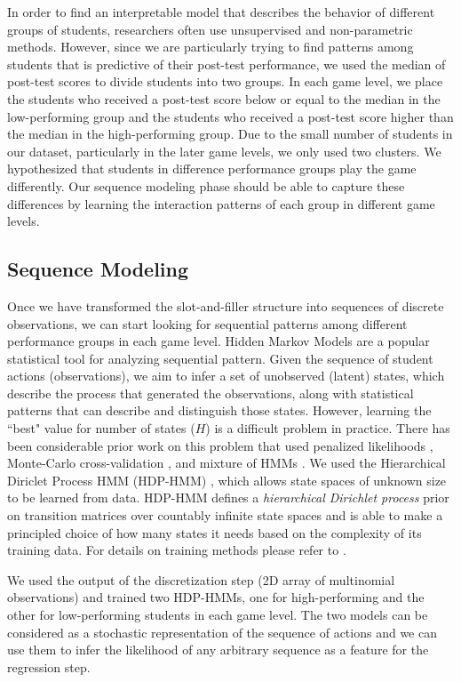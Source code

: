 \documentclass{sigchi}
\begin{document}
In order to find an interpretable model that describes the behavior of different groups of students, researchers often use unsupervised and non-parametric methods.
However, since we are particularly trying to find patterns among students that is predictive of their post-test performance, we used the median of post-test scores to divide students into two groups. 
In each game level, we place the students who received a post-test score below or equal to the median in the low-performing group and the students who received a post-test score higher than the median in the high-performing group.
Due to the small number of students in our dataset, particularly in the later game levels, we only used two clusters. 
We hypothesized that students in difference performance groups play the game differently. 
Our sequence modeling phase should be able to capture these differences by learning the interaction patterns of each group in different game levels.

\subsection{Sequence Modeling}
Once we have transformed the slot-and-filler structure into sequences of discrete observations, we can start looking for sequential patterns among different performance groups in each game level.
Hidden Markov Models are a popular statistical tool for analyzing sequential pattern. 
Given the sequence of student actions (observations), we aim to infer a set of unobserved (latent) states, which describe the process that generated the observations, along with statistical patterns that can describe and distinguish those states.
However, learning the ``best" value for number of states ($H$) is a difficult problem in practice. 
There has been considerable prior work on this problem that used penalized likelihoods \cite{rabiner1989hmm}, Monte-Carlo cross-validation \cite{smyth1996clustering}, and mixture of HMMs \cite{smyth1997clustering}.
We used the Hierarchical Diriclet Process HMM (HDP-HMM) \cite{fox2008hdp}, which allows state spaces of unknown size to be learned from data. 
HDP-HMM defines a \textit{hierarchical Dirichlet process} prior on transition matrices over countably infinite state spaces and is able to make a principled choice of how many states it needs based on the complexity of its training data. 
For details on training methods please refer to \cite{fox2008hdp}.

We used the output of the discretization step (2D array of multinomial observations) and trained two HDP-HMMs, one for high-performing and the other for low-performing students in each game level. The two models can be considered as a stochastic representation of the sequence of actions and we can use them to infer the likelihood of any arbitrary sequence as a feature for the regression step. 
\end{document}
